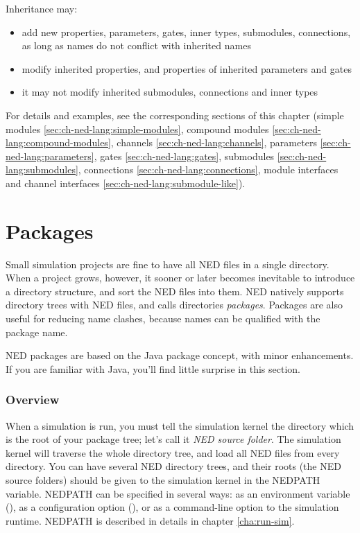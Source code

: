 Inheritance may:
\begin{itemize}
    \item add new properties, parameters, gates, inner types, submodules,
          connections, as long as names do not conflict with inherited names
    \item modify inherited properties, and properties of inherited parameters and
          gates
    \item it may not modify inherited submodules, connections and inner types
\end{itemize}

For details and examples, see the corresponding sections of this chapter
(simple modules \ref{sec:ch-ned-lang:simple-modules},
compound modules \ref{sec:ch-ned-lang:compound-modules},
channels \ref{sec:ch-ned-lang:channels},
parameters \ref{sec:ch-ned-lang:parameters},
gates \ref{sec:ch-ned-lang:gates},
submodules \ref{sec:ch-ned-lang:submodules},
connections \ref{sec:ch-ned-lang:connections},
module interfaces and channel interfaces \ref{sec:ch-ned-lang:submodule-like}).



\section{Packages}
\label{sec:ch-ned-lang:packages}

Small simulation projects are fine to have all NED files in a single
directory. When a project grows, however, it sooner or later becomes
inevitable to introduce a directory structure, and sort the NED files into
them. NED natively supports directory trees with NED files, and calls
directories \textit{packages}. Packages are also useful for reducing
name clashes, because names can be qualified with the package name.

\begin{note}
    NED packages are based on the Java package concept, with minor
    enhancements. If you are familiar with Java, you'll find little
    surprise in this section.
\end{note}

\subsubsection{Overview}

When a simulation is run, you must tell the simulation kernel the
directory which is the root of your package tree; let's call it
\textit{NED source folder}. The simulation kernel will traverse
the whole directory tree, and load all NED files from every directory.
You can have several NED directory trees, and their roots (the NED source
folders) should be given to the simulation kernel in the NEDPATH
variable. NEDPATH can be specified in several ways: as an environment
variable (), as a configuration option (),
or as a command-line option to the simulation runtime. NEDPATH is
described in details in chapter \ref{cha:run-sim}.

